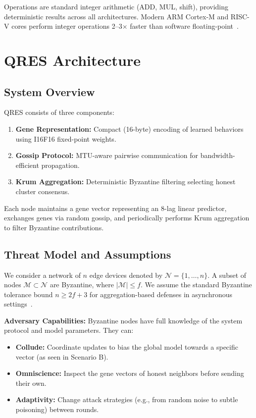 \documentclass[conference,10pt]{IEEEtran}
\begin{document}
Operations are standard integer arithmetic (ADD, MUL, shift), providing deterministic results across all architectures. Modern ARM Cortex-M and RISC-V cores perform integer operations 2--3$\times$ faster than software floating-point~\cite{banner2018scalable}.

\section{QRES Architecture}
\label{sec:architecture}

\subsection{System Overview}
QRES consists of three components:
\begin{enumerate}
    \item \textbf{Gene Representation:} Compact (16-byte) encoding of learned behaviors using I16F16 fixed-point weights.
    \item \textbf{Gossip Protocol:} MTU-aware pairwise communication for bandwidth-efficient propagation.
    \item \textbf{Krum Aggregation:} Deterministic Byzantine filtering selecting honest cluster consensus.
\end{enumerate}

Each node maintains a gene vector representing an 8-lag linear predictor, exchanges genes via random gossip, and periodically performs Krum aggregation to filter Byzantine contributions.

\subsection{Threat Model and Assumptions}
\label{sec:threat_model}
We consider a network of $n$ edge devices denoted by $\mathcal{N} = \{1, \dots, n\}$. A subset of nodes $\mathcal{M} \subset \mathcal{N}$ are Byzantine, where $|\mathcal{M}| \le f$. We assume the standard Byzantine tolerance bound $n \ge 2f + 3$ for aggregation-based defenses in asynchronous settings~\cite{blanchard2017machine}.

\textbf{Adversary Capabilities:} Byzantine nodes have full knowledge of the system protocol and model parameters. They can:
\begin{itemize}
    \item \textbf{Collude:} Coordinate updates to bias the global model towards a specific vector (as seen in Scenario B).
    \item \textbf{Omniscience:} Inspect the gene vectors of honest neighbors before sending their own.
    \item \textbf{Adaptivity:} Change attack strategies (e.g., from random noise to subtle poisoning) between rounds.
\end{itemize}
\end{document}

